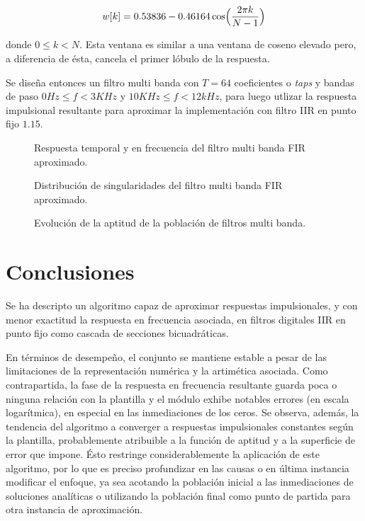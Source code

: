 \documentclass[11pt, journal]{IEEEtran}
\begin{document}
\[
w[k] = 0.53836 - 0.46164 \cos\Bigl(\frac{2 \pi k}{N - 1}\Bigr)
\]

donde \(0 \leq k < N\). Esta ventana es similar a una ventana de coseno
elevado pero, a diferencia de ésta, cancela el primer lóbulo de la
respuesta.

Se diseña entonces un filtro multi banda con \(T = 64\) coeficientes o
\emph{taps} y bandas de paso \(0 Hz \leq f < 3 KHz\) y
\(10 KHz \leq f < 12 kHz\), para luego utlizar la respuesta impulsional
resultante para aproximar la implementación con filtro IIR en punto fijo
\(1.15\).

\begin{figure}
  \centering
  \caption{Respuesta temporal y en frecuencia del filtro multi banda FIR aproximado.}
\end{figure}

\begin{figure}
  \centering
  \caption{Distribución de singularidades del filtro multi banda FIR aproximado.}
\end{figure}
\vfill\null
\newpage
\begin{figure}
  \centering
  \caption{Evolución de la aptitud de la población de filtros multi banda.}
\end{figure}

\section{Conclusiones}

Se ha descripto un algoritmo capaz de aproximar respuestas
impulsionales, y con menor exactitud la respuesta en frecuencia
asociada, en filtros digitales IIR en punto fijo como cascada de
secciones bicuadráticas.

En términos de desempeño, el conjunto se mantiene estable a pesar de las
limitaciones de la representación numérica y la artimética asociada.
Como contrapartida, la fase de la respuesta en frecuencia resultante
guarda poca o ninguna relación con la plantilla y el módulo exhibe
notables errores (en escala logarítmica), en especial en las
inmediaciones de los ceros. Se observa, además, la tendencia del
algoritmo a converger a respuestas impulsionales constantes según la
plantilla, probablemente atribuible a la función de aptitud y a la
superficie de error que impone. Ésto restringe considerablemente la
aplicación de este algoritmo, por lo que es preciso profundizar en las
causas o en última instancia modificar el enfoque, ya sea acotando la
población inicial a las inmediaciones de soluciones analíticas o
utilizando la población final como punto de partida para otra instancia
de aproximación.
\end{document}
